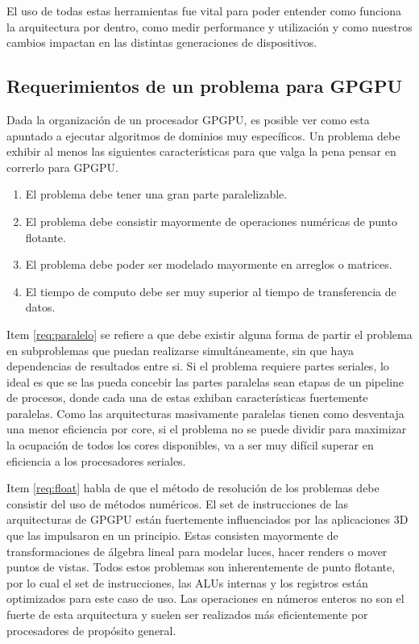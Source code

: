 El uso de todas estas herramientas fue vital para poder entender como funciona la arquitectura por dentro,
como medir performance y utilizaci\'on y como nuestros cambios impactan en las distintas generaciones
de dispositivos.

\subsection{Requerimientos de un problema para GPGPU}
Dada la organizaci\'on de un procesador GPGPU, es posible ver como esta apuntado a ejecutar
algoritmos de dominios muy espec\'ificos. Un problema debe exhibir al menos las siguientes
caracter\'isticas para que valga la pena pensar en correrlo para GPGPU.
\begin{enumerate}
  \item \label{req:paralelo} El problema debe tener una gran parte paralelizable.
  \item \label{req:float} El problema debe consistir mayormente de operaciones num\'ericas de punto flotante.
  \item \label{req:matrix} El problema debe poder ser modelado mayormente en arreglos o matrices.
  \item \label{req:transf} El tiempo de computo debe ser muy superior al tiempo de transferencia de datos.
\end{enumerate}

Item \ref{req:paralelo} se refiere a que debe existir alguna forma de partir el problema
en subproblemas que puedan realizarse simult\'aneamente, sin que haya dependencias de
resultados entre si. Si el problema requiere partes seriales, lo ideal es que se las
pueda concebir las partes paralelas sean etapas de un pipeline de procesos, donde
cada una de estas exhiban caracter\'isticas fuertemente paralelas. Como las arquitecturas
masivamente paralelas tienen como desventaja una menor eficiencia por core, si el
problema no se puede dividir para maximizar la ocupaci\'on de todos los cores disponibles,
va a ser muy dif\'icil superar en eficiencia a los procesadores seriales.

Item \ref{req:float} habla de que el m\'etodo de resoluci\'on de los problemas debe
consistir del uso de m\'etodos num\'ericos. El set de instrucciones de las arquitecturas
de GPGPU est\'an fuertemente influenciados por las aplicaciones 3D que las impulsaron
en un principio. Estas consisten mayormente de transformaciones de \'algebra lineal
para modelar luces, hacer renders o mover puntos de vistas. Todos estos problemas
son inherentemente de punto flotante, por lo cual el set de instrucciones, las ALUs
internas y los registros est\'an optimizados para este caso de uso. Las operaciones
en n\'umeros enteros no son el fuerte de esta arquitectura y suelen ser realizados
m\'as eficientemente por procesadores de prop\'osito general.

